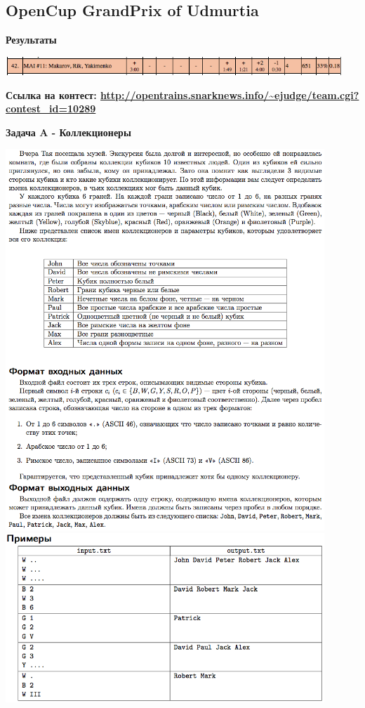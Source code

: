 \documentclass[a4paper,12pt]{article}
\begin{document}
\subsection{OpenCup GrandPrix of Udmurtia}

\textbf{{\large Результаты}} \\
\begin{center}
\includegraphics[width=0.95\textwidth]{OC_Udmurtia/OC_Udmurtia_result.png}\\ [1cm]
\end{center}

\textbf{{\large Ссылка на контест: \url{http://opentrains.snarknews.info/~ejudge/team.cgi?contest_id=10289}}}

\newpage
\textbf{{\large Задача A - Коллекционеры}}

\begin{center}
\includegraphics[width=0.9\textwidth]{OC_Udmurtia/OC_Udmurtia_A1.png}\\ [1cm]
\includegraphics[width=0.9\textwidth]{OC_Udmurtia/OC_Udmurtia_A2.png}\\ [1cm]
\end{center}
\end{document}
